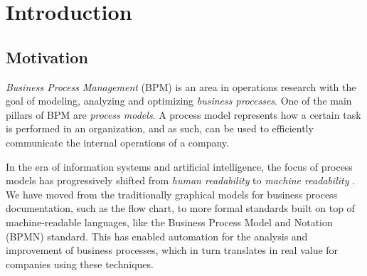 \chapter{Introduction}
\label{cha:intro}

\section{Motivation}



\textit{Business Process Management} (BPM) is an area in operations research
with the goal of modeling, analyzing and optimizing \textit{business processes}.
One of the main pillars of BPM are \emph{process models}. A process model 
represents how a certain task is performed in an organization, and as such, can be
used to efficiently communicate the internal operations of a company.

In the era of information systems and artificial intelligence, the
focus of process models has progressively shifted from \textit{human readability} to
\textit{machine readability} \cite{ter2009modern}. We have moved from the traditionally graphical
models for business process documentation, such as the flow chart, to more
formal standards built on top of machine-readable languages, like the Business
Process Model and Notation (BPMN) \cite{chinosi2012bpmn} standard. This has
enabled automation for the analysis and improvement of business processes, which
in turn translates in real value for companies using these techniques.

